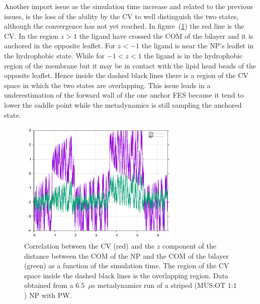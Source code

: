Another import issue as the simulation time increase and related to the previous issues, is the loss of the ability by the \ac{CV} to well distinguish the two states, although the convergence has not yet reached. In figure~(\ref{fig:NPDist}) the red line is the \ac{CV}. In the region $z > 1$ the ligand have crossed the \ac{COM} of the bilayer and it is anchored in the opposite leaflet. For $z < -1$ the ligand is near the \ac{NP}'s leaflet in the hydrophobic state. While for $-1 < z < 1$ the ligand is in the hydrophobic region of the membrane but it may be in contact with the lipid head beads of the opposite leaflet. Hence inside the dashed black lines there is a region of the \ac{CV} space in which the two states are overlapping. This issue leads in a underestimation of the forward wall of the one anchor \ac{FES} because it tend to lower the saddle point while the metadynamics is still sampling the anchored state.
\begin{figure}[!ht]
	\centering
	\includegraphics[width=0.7\textwidth]{./img/results/NPDistance/NPDist}
	\caption{Correlation between the \acs{CV} (red) and the $z$ component of the distance between the \acs{COM} of the \acs{NP} and the \acs{COM} of the bilayer (green) as a function of the simulation time. The region of the \acs{CV} space inside the dashed black lines is the overlapping region. Data obtained from a $6.5$~$\mu$s metadynamics run of a striped (\acs{MUS}:\acs{OT} $1$:$1$) \acs{NP} with \acs{PW}.}
	\label{fig:NPDist}
\end{figure}


